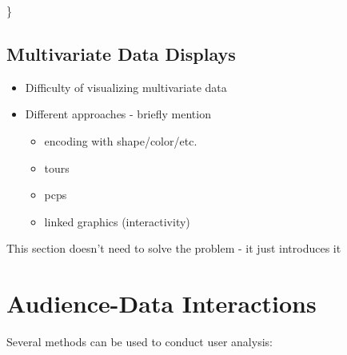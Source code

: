 \documentclass[print]{nuthesis}
\providecommand{\tightlist}{%
  \setlength{\itemsep}{0pt}\setlength{\parskip}{0pt}}
\begin{document}
\}

\hypertarget{multivariate-data-displays}{%
\subsection{Multivariate Data Displays}\label{multivariate-data-displays}}

\begin{itemize}
\tightlist
\item
  Difficulty of visualizing multivariate data
\item
  Different approaches - briefly mention

  \begin{itemize}
  \tightlist
  \item
    encoding with shape/color/etc.
  \item
    tours
  \item
    pcps
  \item
    linked graphics (interactivity)
  \end{itemize}
\end{itemize}

This section doesn't need to solve the problem - it just introduces it

\hypertarget{audience-data-interactions}{%
\section{Audience-Data Interactions}\label{audience-data-interactions}}


Several methods can be used to conduct user analysis:
\end{document}
